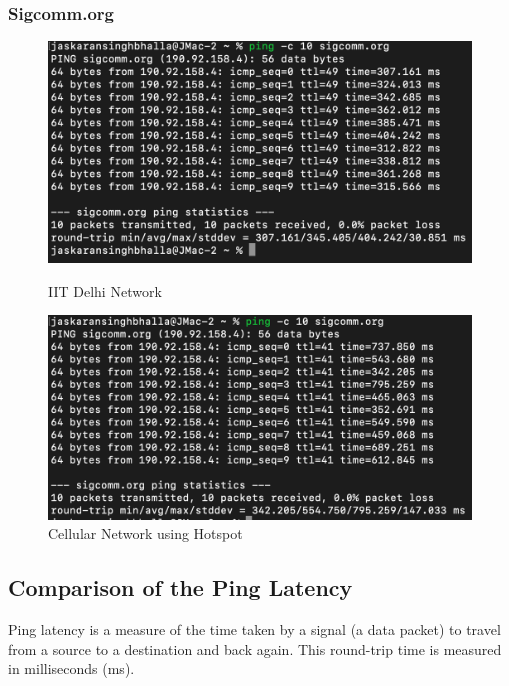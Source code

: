 \documentclass{article}
\begin{document}
\subsubsection*{Sigcomm.org}

\begin{figure}[H]
    \centering
    \begin{minipage}{0.45\textwidth}
        \centering
        \includegraphics[width=\linewidth]{part-1/ping-sigcomm-iitd.png}
        \caption{IIT Delhi Network}
    \end{minipage}
    \hfill
    \begin{minipage}{0.45\textwidth}
        \centering
        \includegraphics[width=\linewidth]{part-1/ping-sigcomm-hotspot.png}
        \caption{Cellular Network using Hotspot}
    \end{minipage}
\end{figure}

\subsection{Comparison of the Ping Latency}

Ping latency is a measure of the time taken by a signal (a data packet) to travel from a source to a destination and back again. This round-trip time is measured in milliseconds (ms). 
\end{document}
